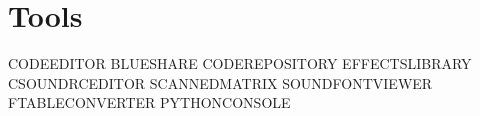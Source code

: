 \section{Tools}\label{tools}

CODEEDITOR BLUESHARE CODEREPOSITORY EFFECTSLIBRARY CSOUNDRCEDITOR
SCANNEDMATRIX SOUNDFONTVIEWER FTABLECONVERTER PYTHONCONSOLE
